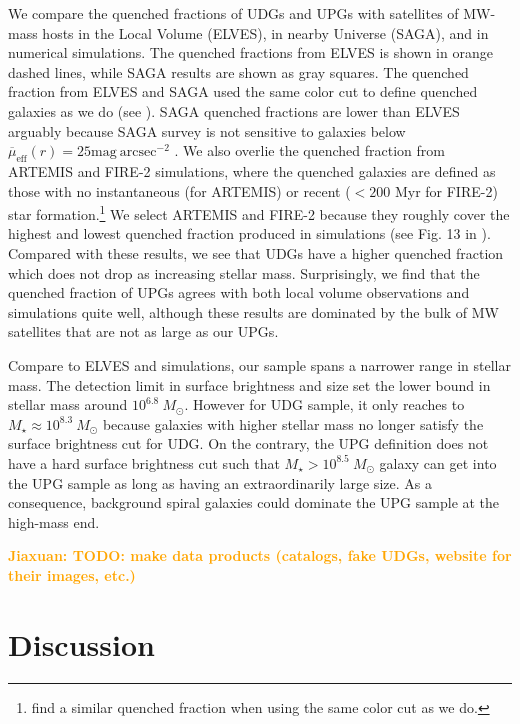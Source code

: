 \documentclass[twocolumn,astrosymb,twocolappendix]{aastex631}
\newcommand{\sbunit}{\mathrm{mag\ arcsec}^{-2}}
\newcommand{\sbeffr}{\overline{\mu}_{\mathrm{eff}}(r)}
\newcommand{\jiaxuan}[1]{\textcolor{orange}{\textbf{Jiaxuan: #1}}}
\begin{document}
\begin{CJK*}{UTF8}{gbsn}
We compare the quenched fractions of UDGs and UPGs with satellites of MW-mass hosts in the Local Volume (ELVES), in nearby Universe (SAGA), and in numerical simulations. The quenched fractions from ELVES is shown in orange dashed lines, while SAGA results are shown as gray squares. The quenched fraction from ELVES and SAGA used the same color cut to define quenched galaxies as we do (see \citealt{CarlstenELVES2022}). SAGA quenched fractions are lower than ELVES arguably because SAGA survey is not sensitive to galaxies below $\sbeffr = 25\sbunit$ \citep{Font2022}. We also overlie the quenched fraction from ARTEMIS \citep[purple lines,][]{Font2022} and FIRE-2 \citep[pink dotted lines][]{Samuel2022} simulations, where the quenched galaxies are defined as those with no instantaneous (for ARTEMIS) or recent ($<200$ Myr for FIRE-2) star formation.\footnote{\citet{Font2022} find a similar quenched fraction when using the same color cut as we do.} We select ARTEMIS and FIRE-2 because they roughly cover the highest and lowest quenched fraction produced in simulations (see Fig. 13 in \citealt{Samuel2022}). Compared with these results, we see that UDGs have a higher quenched fraction which does not drop as increasing stellar mass. Surprisingly, we find that the quenched fraction of UPGs agrees with both local volume observations and simulations quite well, although these results are dominated by the bulk of MW satellites that are not as large as our UPGs. 

Compare to ELVES and simulations, our sample spans a narrower range in stellar mass. The detection limit in surface brightness and size set the lower bound in stellar mass around $10^{6.8}\ M_\odot$. However for UDG sample, it only reaches to $M_\star\approx 10^{8.3}\ M_\odot$ because galaxies with higher stellar mass no longer satisfy the surface brightness cut for UDG. On the contrary, the UPG definition does not have a hard surface brightness cut such that $M_\star > 10^{8.5}\ M_\odot$ galaxy can get into the UPG sample as long as having an extraordinarily large size. As a consequence, background spiral galaxies could dominate the UPG sample at the high-mass end.


\jiaxuan{TODO: make data products (catalogs, fake UDGs, website for their images, etc.)}

\section{Discussion}\label{sec:discussion}


\end{CJK*}
\end{document}
